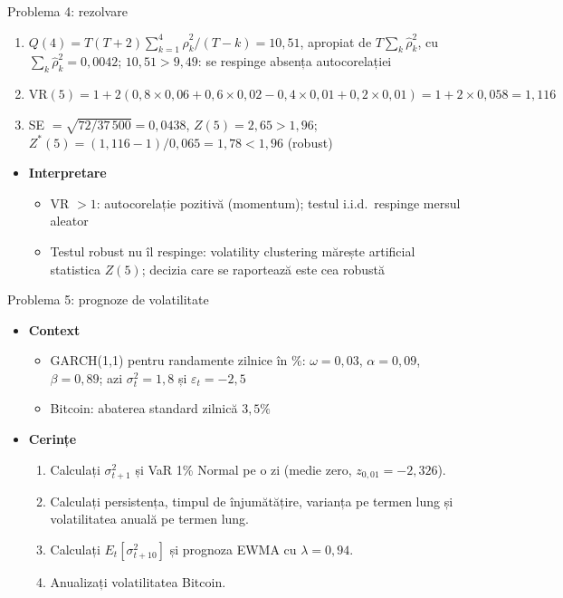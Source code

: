 \begin{frame}{Problema 4: rezolvare}
\itemsize{\footnotesize}
\begin{enumerate}
    \item $Q(4) = T(T+2)\sum_{k=1}^{4}\hat\rho_k^2/(T-k) = 10{,}51$, apropiat de $T\sum_k\hat\rho_k^2$, cu $\sum_k\hat\rho_k^2 = 0{,}0042$; $10{,}51 > 9{,}49$: se respinge absența autocorelației
    \item $\mathrm{VR}(5) = 1 + 2(0{,}8 \times 0{,}06 + 0{,}6 \times 0{,}02 - 0{,}4 \times 0{,}01 + 0{,}2 \times 0{,}01) = 1 + 2 \times 0{,}058 = 1{,}116$
    \item SE $= \sqrt{72/37\,500} = 0{,}0438$, $Z(5) = 2{,}65 > 1{,}96$; $Z^*(5) = (1{,}116 - 1)/0{,}065 = 1{,}78 < 1{,}96$ (robust)
\end{enumerate}
\begin{itemize}
    \item \textbf{Interpretare}
    \begin{itemize}
        \item VR $> 1$: autocorelație pozitivă (momentum); testul i.i.d.\ respinge mersul aleator
        \item Testul robust nu îl respinge: volatility clustering mărește artificial statistica $Z(5)$; decizia care se raportează este cea robustă
    \end{itemize}
\end{itemize}
\end{frame}

\begin{frame}{Problema 5: prognoze de volatilitate}
\itemsize{\footnotesize}
\begin{itemize}
    \item \textbf{Context}
    \begin{itemize}
        \item GARCH(1,1) pentru randamente zilnice în \%: $\omega = 0{,}03$, $\alpha = 0{,}09$, $\beta = 0{,}89$; azi $\sigma_t^2 = 1{,}8$ și $\varepsilon_t = -2{,}5$
        \item Bitcoin: abaterea standard zilnică $3{,}5\%$
    \end{itemize}
    \item \textbf{Cerințe}
\begin{enumerate}
    \item Calculați $\sigma_{t+1}^2$ și VaR 1\% Normal pe o zi (medie zero, $z_{0,01} = -2{,}326$).
    \item Calculați persistența, timpul de înjumătățire, varianța pe termen lung și volatilitatea anuală pe termen lung.
    \item Calculați $E_t[\sigma_{t+10}^2]$ și prognoza EWMA cu $\lambda = 0{,}94$.
    \item Anualizați volatilitatea Bitcoin.
\end{enumerate}
\end{itemize}
\end{frame}

